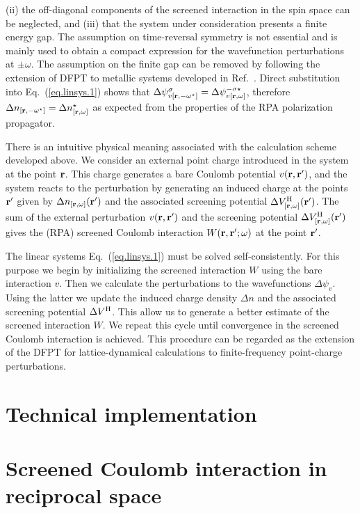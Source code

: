\documentclass[twocolumn,prb,showpacs,superscriptaddress]{revtex4}
\def\w{\omega}
\def\s{\sigma}
\def\r{{\bf r}}
\def\rp{{\bf r^\prime}}
\begin{document}
(ii) the off-diagonal components of the screened interaction in the spin space
can be neglected, and (iii) that the system under consideration presents a finite 
energy gap. The assumption on time-reversal symmetry is not essential and is mainly used to
obtain a compact expression for the wavefunction perturbations at
$\pm\w$. The assumption on the finite gap can be removed by following the extension
of DFPT to metallic systems developed in Ref.\ . 
Direct substitution into Eq.\ (\ref{eq.linsys.1}) shows that 
$\Delta \psi^\s_{v[\r,-\w^\star]} = \Delta \psi_{v[\r,\w]}^{-\s\star}$,
therefore $\Delta n_{[\r,-\w^\star]}=\Delta n^\star_{[\r,\w]}$ as expected
from the properties of the RPA polarization propagator.

There is an intuitive physical meaning associated with the calculation scheme developed above.
We consider an external point charge introduced in the system
at the point $\r$. This charge generates a bare Coulomb potential $v(\r,\rp)$,
and the system reacts to the perturbation by generating an induced charge
at the points $\rp$ given by $\Delta n_{[\r,\w]}(\rp)$ and the associated 
screening potential $\Delta V^{\rm H}_{[\r,\w]}(\rp)$.
The sum of the external perturbation $v(\r,\rp)$ and the screening
potential $\Delta V^{\rm H}_{[\r,\w]}(\rp)$ gives the (RPA) screened Coulomb
interaction $W(\r,\rp;\w)$ at the point $\rp$.

The linear systems Eq.\ (\ref{eq.linsys.1}) must be solved self-consistently.
For this purpose we begin by initializing the screened
interaction $W$ using the bare interaction $v$. 
Then we calculate the perturbations to the wavefunctions $\Delta \psi_v$.
Using the latter we update the induced charge density $\Delta n$
and the associated screening potential $\Delta V^{\rm H}$. This allow us to
generate a better estimate of the screened interaction $W$.
We repeat this cycle until convergence in the screened Coulomb
interaction is achieved. This procedure can be regarded as the extension
of the DFPT for lattice-dynamical calculations to finite-frequency
point-charge perturbations.

\section{Technical implementation}

\section{Screened Coulomb interaction in reciprocal space}
\end{document}
